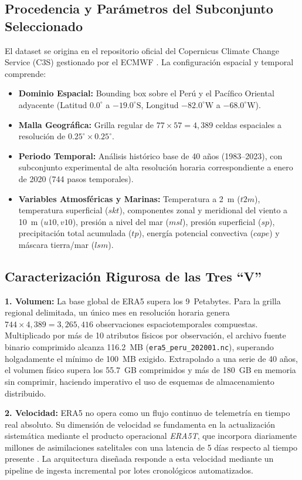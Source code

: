 \documentclass[conference]{IEEEtran}
\begin{document}
\subsection{Procedencia y Parámetros del Subconjunto Seleccionado}
El dataset se origina en el repositorio oficial del Copernicus Climate Change Service (C3S) gestionado por el ECMWF \cite{ecmwf2026era5, hersbach2020era5}. La configuración espacial y temporal comprende:
\begin{itemize}
    \item \textbf{Dominio Espacial:} Bounding box sobre el Perú y el Pacífico Oriental adyacente (Latitud $0.0^\circ$ a $-19.0^\circ\text{S}$, Longitud $-82.0^\circ\text{W}$ a $-68.0^\circ\text{W}$).
    \item \textbf{Malla Geográfica:} Grilla regular de $77 \times 57 = 4,389$ celdas espaciales a resolución de $0.25^\circ \times 0.25^\circ$.
    \item \textbf{Periodo Temporal:} Análisis histórico base de 40 años (1983--2023), con subconjunto experimental de alta resolución horaria correspondiente a enero de 2020 (744 pasos temporales).
    \item \textbf{Variables Atmosféricas y Marinas:} Temperatura a 2~m ($t2m$), temperatura superficial ($skt$), componentes zonal y meridional del viento a 10~m ($u10, v10$), presión a nivel del mar ($msl$), presión superficial ($sp$), precipitación total acumulada ($tp$), energía potencial convectiva ($cape$) y máscara tierra/mar ($lsm$).
\end{itemize}

\subsection{Caracterización Rigurosa de las Tres ``V''}
\textbf{1. Volumen:} La base global de ERA5 supera los 9~Petabytes. Para la grilla regional delimitada, un único mes en resolución horaria genera $744 \times 4,389 = 3,265,416$ observaciones espaciotemporales compuestas. Multiplicado por más de 10 atributos físicos por observación, el archivo fuente binario comprimido alcanza 116.2~MB (\texttt{era5\_peru\_202001.nc}), superando holgadamente el mínimo de 100~MB exigido. Extrapolado a una serie de 40 años, el volumen físico supera los 55.7~GB comprimidos y más de 180~GB en memoria sin comprimir, haciendo imperativo el uso de esquemas de almacenamiento distribuido.

\textbf{2. Velocidad:} ERA5 no opera como un flujo continuo de telemetría en tiempo real absoluto. Su dimensión de velocidad se fundamenta en la actualización sistemática mediante el producto operacional \textit{ERA5T}, que incorpora diariamente millones de asimilaciones satelitales con una latencia de 5 días respecto al tiempo presente \cite{ecmwf2026era5}. La arquitectura diseñada responde a esta velocidad mediante un pipeline de ingesta incremental por lotes cronológicos automatizados.
\end{document}
